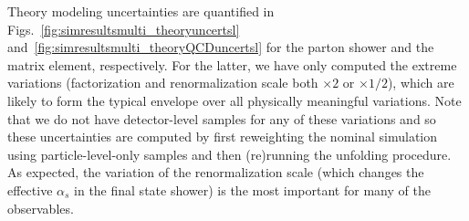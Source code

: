 Theory modeling uncertainties are quantified in Figs.~\ref{fig:simresultsmulti_theoryuncertsl} and~\ref{fig:simresultsmulti_theoryQCDuncertsl} for the parton shower and the matrix element, respectively.  For the latter, we have only computed the extreme variations (factorization and renormalization scale both $\times 2$ or $\times 1/2$), which are likely to form the typical envelope over all physically meaningful variations.  Note that we do not have detector-level samples for any of these variations and so these uncertainties are computed by first reweighting the nominal simulation using particle-level-only samples and then (re)running the unfolding procedure.   As expected, the variation of the renormalization scale (which changes the effective $\alpha_s$ in the final state shower) is the most important for many of the observables.

